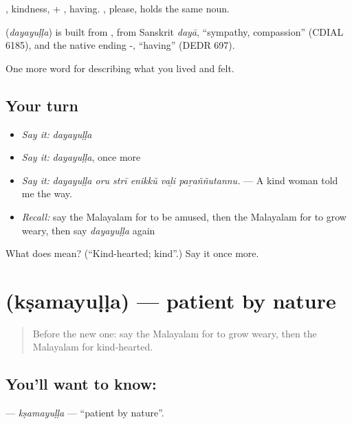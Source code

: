 , kindness, + , having. , please, holds the same noun.

\begin{cousinweb}
\textbf{} (\emph{dayayuḷḷa}) is built from , from Sanskrit \emph{dayā}, \textquotedblleft{}sympathy, compassion\textquotedblright{} (CDIAL 6185), and the native ending -, \textquotedblleft{}having\textquotedblright{} (DEDR 697).
\end{cousinweb}

\begin{grammarlens}[title={What you've built}]
One more word for describing what you lived and felt.
\end{grammarlens}

\subsection*{Your turn}
\begin{itemize}
\raggedright
  \item \emph{Say it:} \emph{dayayuḷḷa}
  \item \emph{Say it:} \emph{dayayuḷḷa}, once more
  \item \emph{Say it:} \emph{dayayuḷḷa oru strī enikkŭ vaḻi paṟaññutannu.} — A kind woman told me the way.
  \item \emph{Recall:} say the Malayalam for to be amused, then the Malayalam for to grow weary, then say \emph{dayayuḷḷa} again
\end{itemize}

\begin{tcolorbox}[breakable,colback=teal!4,colframe=teal!35!black,title={Before you move on}]
What does  mean? (\textquotedblleft{}Kind-hearted; kind\textquotedblright{}.) Say it once more.
\end{tcolorbox}
\section[\texorpdfstring{\ml{ക്ഷമയുള്ള} (kṣamayuḷḷa)}{ക്ഷമയുള്ള (kṣamayuḷḷa)}]{ (kṣamayuḷḷa) — patient by nature}

\label{lesson:ML-C527-ksamayulla}



\begin{quote}
Before the new one: say the Malayalam for to grow weary, then the Malayalam for kind-hearted.
\end{quote}

\subsection*{You'll want to know: }
\textbf{} — \emph{kṣamayuḷḷa} — \textquotedblleft{}patient by nature\textquotedblright{}.


